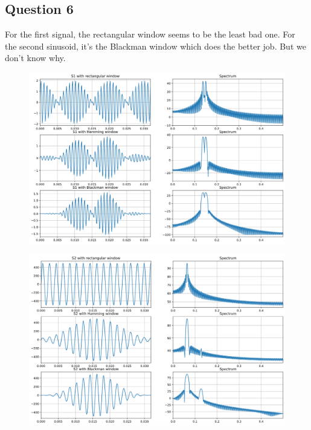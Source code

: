 \documentclass[]{article}
\begin{document}
\subsection*{Question 6}


For the first signal, the rectangular window seems to be the least bad one. For the second sinusoid, it's the Blackman window which does the better job. But we don't know why.

\begin{figure}[H]
    \centering
\includegraphics[scale=0.25]{q61.png}
\end{figure}

\begin{figure}[H]
    \centering
\includegraphics[scale=0.25]{q62.png}
\end{figure}
\end{document}

